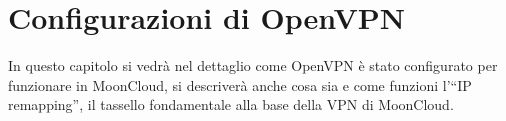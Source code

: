\chapter{Configurazioni di OpenVPN}

In questo capitolo si vedrà nel dettaglio come OpenVPN è stato configurato
per funzionare in MoonCloud, si descriverà anche cosa sia e come funzioni l'``IP remapping'',
il tassello fondamentale alla base della VPN di MoonCloud.








